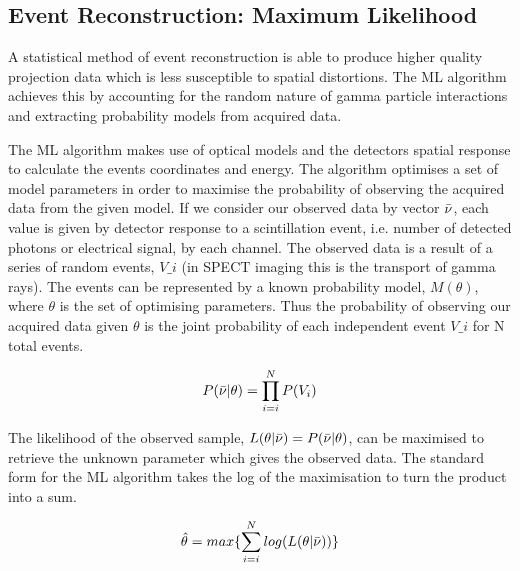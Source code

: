 \subsection{Event Reconstruction: Maximum Likelihood}
A statistical method of event reconstruction is able  to produce higher quality projection data which is less susceptible to spatial distortions. The \acrlong{ML} algorithm achieves this by accounting for the random nature of gamma particle interactions and extracting probability models from acquired data.

The \acrshort{ML} algorithm makes use of optical models and the detectors spatial response to calculate the events coordinates and energy. The algorithm optimises a set of model parameters in order to maximise the probability of observing the acquired data from the given model. If we consider our observed data by vector $\Bar{\nu}$, each value is given by detector response to a scintillation event, i.e. number of detected photons or electrical signal, by each channel. The observed data is a result of a series of random events, $V\_i$ (in SPECT imaging this is the transport of gamma rays). The events can be represented by a known probability model, $M(\theta)$, where $\theta$ is the set of optimising parameters. Thus the probability of observing our acquired data given $\theta$ is the joint probability of each independent event $V\_i$ for N total events. 

\begin{equation} \label{eqn:MLProb}
                P(\Bar{\nu}|\theta) = \prod^{N}_{i=i}P(V_i)
\end{equation}

The likelihood of the observed sample, $L(\theta|\Bar{\nu}) = P(\Bar{\nu}|\theta)$, can be maximised to retrieve the unknown parameter which gives the observed data. The standard form for the \acrshort{ML} algorithm takes the log of the maximisation to turn the product into a sum. 

\begin{equation} \label{eqn:ML}
                \hat{\theta} = max\{\sum^{N}_{i=i}log(L(\theta|\Bar{\nu}))\}
\end{equation}


